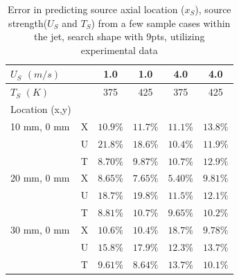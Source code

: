 \documentclass[preprint,12pt]{elsarticle}
\begin{document}
\begin{table}[!h!t!b!p]
\begin{center}
\begin{tabular}{ l | l c c c c}
\hline
 $U_{S}$ $(m/s)$ & & 1.0 & 1.0 & 4.0 & 4.0 \\ \hline
 $T_S$ $(K)$ & & 375 & 425 & 375 & 425  \\ \hline \hline
 Location (x,y) & \\
 10 mm, 0 mm & X & $10.9\%$ & $11.7\%$ & $11.1\%$ & $13.8\%$ \\
 			 & U & $21.8\%$ & $18.6\%$ & $10.4\%$ & $11.9\%$ \\
 			 & T & $8.70\%$ & $9.87\%$ & $10.7\%$ & $12.9\%$ \\ \hline
 20 mm, 0 mm & X & $8.65\%$ & $7.65\%$ & $5.40\%$ & $9.81\%$ \\
 			 & U & $18.7\%$ & $19.8\%$ & $11.5\%$ & $12.1\%$ \\
 			 & T & $8.81\%$ & $10.7\%$ & $9.65\%$ & $10.2\%$ \\ \hline
 30 mm, 0 mm & X & $10.6\%$ & $10.4\%$ & $18.7\%$ & $9.78\%$ \\
 			 & U & $15.8\%$ & $17.9\%$ & $12.3\%$ & $13.7\%$ \\
 			 & T & $9.61\%$ & $8.64\%$ & $13.7\%$ & $10.1\%$ \\ \hline			 
 \end{tabular}
\caption{Error in predicting source axial location ($x_S$), source strength($U_S$ and $T_S$) from a few sample cases within the jet, search shape with 9pts, utilizing experimental data\cite{vanderveer}}
\label{tab:typejetF}
\end{center}
\end{table}
\end{document}
